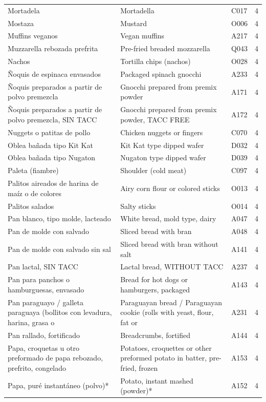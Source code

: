 {\begin{longtable}{p{4.3cm}p{5.5cm}p{1.5cm}p{0.7cm}}
Mortadela & Mortadella & C017 & 4\\
Mostaza & Mustard & O006 & 4\\
Muffins veganos & Vegan muffins & A217 & 4\\
Muzzarella rebozada prefrita & Pre-fried breaded mozzarella & Q043 & 4\\
Nachos & Tortilla chips (nachos) & O028 & 4\\
Ñoquis de espinaca envasados & Packaged spinach gnocchi & A233 & 4\\
Ñoquis preparados a partir de polvo premezcla & Gnocchi prepared from premix powder & A171 & 4\\
Ñoquis preparados a partir de polvo premezcla, SIN TACC & Gnocchi prepared from premix powder, TACC FREE & A172 & 4\\
Nuggets o patitas de pollo & Chicken nuggets or fingers & C070 & 4\\
Oblea bañada tipo Kit Kat & Kit Kat type dipped wafer & D032 & 4\\
Oblea bañada tipo Nugaton & Nugaton type dipped wafer & D039 & 4\\
Paleta (fiambre) & Shoulder (cold meat) & C097 & 4\\
Palitos aireados de harina de maíz o de colores & Airy corn flour or colored sticks & O013 & 4\\
Palitos salados & Salty sticks & O014 & 4\\
Pan blanco, tipo molde, lacteado & White bread, mold type, dairy & A047 & 4\\
Pan de molde con salvado & Sliced bread with bran & A048 & 4\\
Pan de molde con salvado sin sal & Sliced bread with bran without salt & A141 & 4\\
Pan lactal, SIN TACC & Lactal bread, WITHOUT TACC & A237 & 4\\
Pan para panchos o hamburguesas, envasado & Bread for hot dogs or hamburgers, packaged & A143 & 4\\
Pan paraguayo / galleta paraguaya (bollitos con levadura, harina, grasa o & Paraguayan bread / Paraguayan cookie (rolls with yeast, flour, fat or & A231 & 4\\
Pan rallado, fortificado & Breadcrumbs, fortified & A144 & 4\\
Papa, croquetas u otro preformado de papa rebozado, prefrito, congelado & Potatoes, croquettes or other preformed potato in batter, pre-fried, frozen & A153 & 4\\
Papa, puré instantáneo (polvo)* & Potato, instant mashed (powder)* & A152 & 4\\

\end{longtable}}
